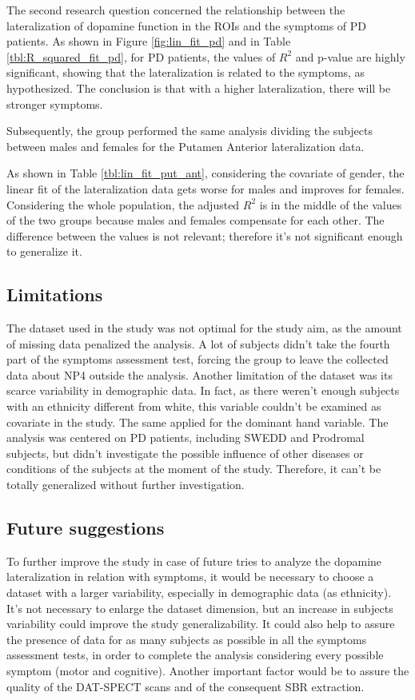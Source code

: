 \documentclass[]{article}
\begin{document}
\begin{multicols}{2}
The second research question concerned the relationship between the lateralization of dopamine function in the ROIs and the symptoms of PD patients.
As shown in Figure \ref{fig:lin_fit_pd} and in Table \ref{tbl:R_squared_fit_pd}, for PD patients, the values of $R^2$ and p-value are highly significant, showing that the lateralization is related to the symptoms, as hypothesized. The conclusion is that with a higher lateralization, there will be stronger symptoms.

Subsequently, the group performed the same analysis dividing the subjects between males and females for the Putamen Anterior lateralization data.

As shown in Table \ref{tbl:lin_fit_put_ant}, considering the covariate of gender, the linear fit of the lateralization data gets worse for males and improves for females.
Considering the whole population, the adjusted $R^2$ is in the middle of the values of the two groups because males and females compensate for each other. The difference between the values is not relevant; therefore it's not significant enough to generalize it.

\subsection{Limitations}

The dataset used in the study was not optimal for the study aim, as the amount of missing data penalized the analysis. A lot of subjects didn't take the fourth part of the symptoms assessment test, forcing the group to leave the collected data about NP4 outside the analysis. 
Another limitation of the dataset was its scarce variability in demographic data. In fact, as there weren't enough subjects with an ethnicity different from white, this variable couldn't be examined as covariate in the study. The same applied for the dominant hand variable. 
The analysis was centered on PD patients, including SWEDD and Prodromal subjects, but didn't investigate the possible influence of other diseases or conditions of the subjects at the moment of the study. Therefore, it can't be totally generalized without further investigation. 

\subsection{Future suggestions}

To further improve the study in case of future tries to analyze the dopamine lateralization in relation with symptoms, it would be necessary to choose a dataset with a larger variability, especially in demographic data (as ethnicity). It's not necessary to enlarge the dataset dimension, but an increase in subjects variability could improve the study generalizability.
It could also help to assure the presence of data for as many subjects as possible in all the symptoms assessment tests, in order to complete the analysis considering every possible symptom (motor and cognitive). 
Another important factor would be to assure the quality of the DAT-SPECT scans and of the consequent SBR extraction. 


\end{multicols}
\end{document}
